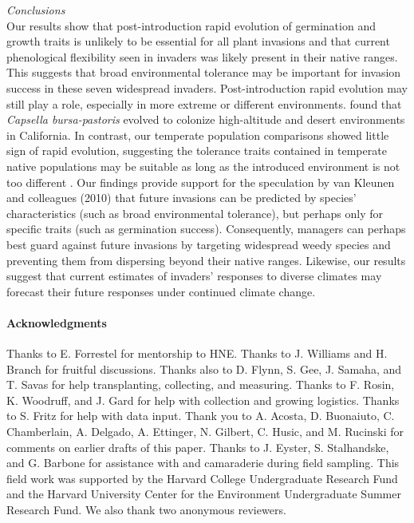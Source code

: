 \documentclass[11pt]{article}\usepackage[]{graphicx}\usepackage[]{color}
\begin{document}
\emph{Conclusions}\\ 
	Our results show that post-introduction rapid evolution of germination and growth traits is unlikely to be essential for all plant invasions and that current phenological flexibility seen in invaders was likely present in their native ranges. This suggests that broad environmental tolerance may be important for invasion success in these seven widespread invaders. Post-introduction rapid evolution may still play a role, especially in more extreme or different environments. \textcite{Linde2001} found that \textit{Capsella bursa-pastoris} evolved to colonize high-altitude and desert environments in California. In contrast, our temperate population comparisons showed little sign of rapid evolution, suggesting the tolerance traits contained in temperate native populations may be suitable as long as the introduced environment is not too different \parencite{Baker1965}. Our findings provide support for the speculation by van Kleunen and colleagues (2010) that future invasions can be predicted by species' characteristics (such as broad environmental tolerance), but perhaps only for specific traits (such as germination success). Consequently, managers can perhaps best guard against future invasions by targeting widespread weedy species and preventing them from dispersing beyond their native ranges. Likewise, our results suggest that current estimates of invaders' responses to diverse climates may forecast their future responses under continued climate change. 
	
\paragraph{Acknowledgments}
Thanks to E. Forrestel for mentorship to HNE. Thanks to J. Williams and H. Branch for fruitful discussions. Thanks also to D. Flynn, S. Gee, J. Samaha, and T. Savas for help transplanting, collecting, and measuring. Thanks to F. Rosin, K. Woodruff, and J. Gard for help with collection and growing logistics. Thanks to S. Fritz for help with data input. Thank you to A. Acosta, D. Buonaiuto, C. Chamberlain, A. Delgado, A. Ettinger, N. Gilbert, C. Husic, and M. Rucinski for comments on earlier drafts of this paper. Thanks to J. Eyster, S. Stalhandske, and G. Barbone for assistance with and camaraderie during field sampling. This field work was supported by the Harvard College Undergraduate Research Fund and the Harvard University Center for the Environment Undergraduate Summer Research Fund. We also thank two anonymous reviewers. %
\end{document}
